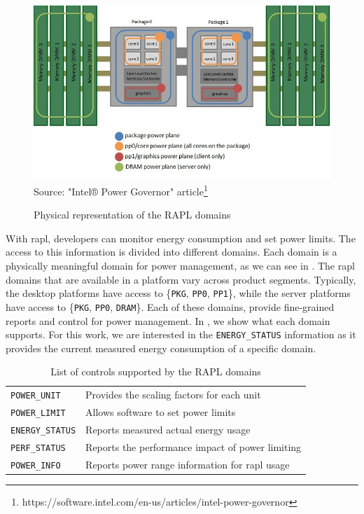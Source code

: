 \begin{savenotes}
\begin{figure}[htp]
  \centering
  \caption{Physical representation of the RAPL domains}
  \includegraphics[width=\columnwidth]{images/power-planes-placeholder}
  \footnotesize{Source: "Intel® Power Governor" article\footnote{https://software.intel.com/en-us/articles/intel-power-governor}}
  \label{fig:power-planes}
\end{figure}
\end{savenotes}

With \ac{rapl}, developers can monitor energy consumption and set power limits. The access to this information is divided into different domains. Each domain is a physically meaningful domain for power management, as we can see in . The \ac{rapl} domains that are available in a platform vary across product segments. Typically, the desktop platforms have access to \{\texttt{PKG}, \texttt{PP0}, \texttt{PP1}\}, while the server platforms have access to \{\texttt{PKG}, \texttt{PP0}, \texttt{DRAM}\}. Each of these domains, provide fine-grained reports and control for power management. In , we show what each domain supports. For this work, we are interested in the \texttt{ENERGY\_STATUS} information as it provides the current measured energy consumption of a specific domain.

\begin{table}[htp]
	\centering
	\caption{List of controls supported by the RAPL domains}
	\begin{tabular}{ll}
	  \toprule
		\texttt{POWER\_UNIT}    & Provides the scaling factors for each unit\\
		\texttt{POWER\_LIMIT}   & Allows software to set power limits\\
		\texttt{ENERGY\_STATUS} & Reports measured actual energy usage\\
		\texttt{PERF\_STATUS}   & Reports the performance impact of power limiting\\
		\texttt{POWER\_INFO}    & Reports power range information for \ac{rapl} usage\\
	  \bottomrule
	\end{tabular}
	\label{tbl:rapl-domains}
\end{table}

